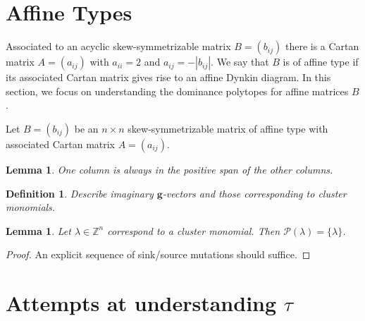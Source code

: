 \documentclass{amsart}
\newtheorem{definition}[theorem]{Definition}
\newtheorem{lemma}[theorem]{Lemma}
\numberwithin{theorem}{section}
\newcommand{\bfg}{\boldsymbol{g}}
\newcommand{\cP}{\mathcal{P}}
\newcommand{\ZZ}{\mathbb{Z}}
\begin{document}
  \section{Affine Types}
  Associated to an acyclic skew-symmetrizable matrix $B=(b_{ij})$ there is a Cartan matrix $A=(a_{ij})$ with $a_{ii}=2$ and $a_{ij}=-|b_{ij}|$.
  We say that $B$ is of affine type if its associated Cartan matrix gives rise to an affine Dynkin diagram.
  In this section, we focus on understanding the dominance polytopes for affine matrices $B$.

  Let $B=(b_{ij})$ be an $n\times n$ skew-symmetrizable matrix of affine type with associated Cartan matrix $A=(a_{ij})$.
  
  \begin{lemma}
    One column is always in the positive span of the other columns.
  \end{lemma}

  \begin{definition}
    Describe imaginary $\bfg$-vectors and those corresponding to cluster monomials.
  \end{definition}

  \begin{lemma}
    Let $\lambda\in\ZZ^n$ correspond to a cluster monomial.
    Then $\cP(\lambda)=\{\lambda\}$.
  \end{lemma}
  \begin{proof}
    An explicit sequence of sink/source mutations should suffice.
  \end{proof}

  \section{Attempts at understanding $\tau$}
\end{document}

